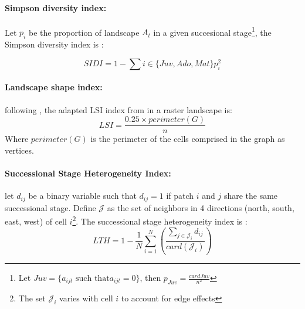 

\paragraph{Simpson diversity index:}
Let $p_i$ be the proportion of landscape $A_t$ in a given succesional stage\footnote{Let $Juv = \{a_{ijt} \text{ such that} a_{ijt}=0\}$, then $p_{Juv} = \frac{card{Juv}}{n^2}$}, the Simpson diversity index is : 

\begin{equation}
SIDI = 1 - \sum{i \in \{Juv, Ado, Mat\}} p_i^2
    \label{eq:simpson}
\end{equation}


\paragraph{Landscape shape index:}
following \cite{McGarigal_1995}, the adapted LSI index from \cite{patton_diversity_1975} in a raster landscape is:
\begin{equation}
    LSI = \frac{0.25\times perimeter(G)}{n}
    \label{eq:LSI}
\end{equation}
Where $perimeter(G)$ is the perimeter of the cells comprised in the graph as vertices.

\paragraph{Successional Stage Heterogeneity Index:} let $d_{ij}$ be a binary variable such that $d_{ij}=1$ if patch $i$ and $j$ share the same successional stage. Define $\mathcal{J}$ as the set of neighbors in 4 directions (north, south, east, west) of cell $i$\footnote{The set $\mathcal{J}_i$ varies with cell $i$ to account for edge effects}.
The successional stage heterogeneity index is : 
\begin{equation}
    LTH = 1 - \frac{1}{N}\sum_{i=1}^N\left( \frac{\sum_{j \in \mathcal{J}_i} d_{ij}}{card(\mathcal{J}_i)}\right)
\end{equation}
\label{eq:lth_index}


